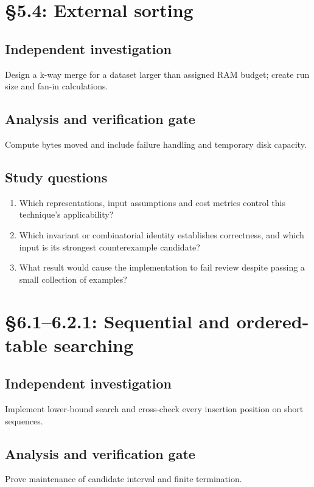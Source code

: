 \documentclass[11pt,letterpaper]{article}
\begin{document}
\section{\S 5.4: External sorting}
\subsection{Independent investigation}
Design a k-way merge for a dataset larger than assigned RAM budget; create run size and fan-in calculations.
\subsection{Analysis and verification gate}
Compute bytes moved and include failure handling and temporary disk capacity.
\subsection{Study questions}
\begin{enumerate}
\item Which representations, input assumptions and cost metrics control this technique's applicability?
\item Which invariant or combinatorial identity establishes correctness, and which input is its strongest counterexample candidate?
\item What result would cause the implementation to fail review despite passing a small collection of examples?
\end{enumerate}

\section{\S 6.1--6.2.1: Sequential and ordered-table searching}
\subsection{Independent investigation}
Implement lower-bound search and cross-check every insertion position on short sequences.
\subsection{Analysis and verification gate}
Prove maintenance of candidate interval and finite termination.
\end{document}
